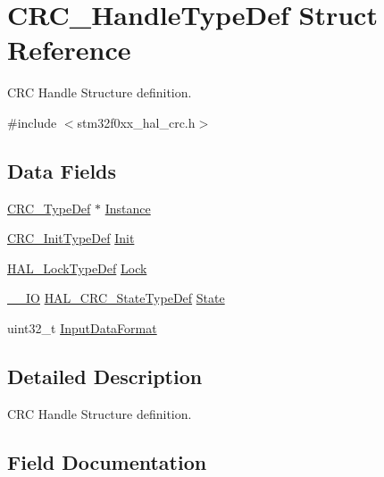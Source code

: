 \hypertarget{struct_c_r_c___handle_type_def}{}\section{C\+R\+C\+\_\+\+Handle\+Type\+Def Struct Reference}
\label{struct_c_r_c___handle_type_def}


C\+RC Handle Structure definition.  




{\ttfamily \#include $<$stm32f0xx\+\_\+hal\+\_\+crc.\+h$>$}

\subsection*{Data Fields}
\begin{DoxyCompactItemize}
\item 
\hyperlink{struct_c_r_c___type_def}{C\+R\+C\+\_\+\+Type\+Def} $\ast$ \hyperlink{struct_c_r_c___handle_type_def_ad47f94224843c74bd605a4299349798a}{Instance}
\item 
\hyperlink{struct_c_r_c___init_type_def}{C\+R\+C\+\_\+\+Init\+Type\+Def} \hyperlink{struct_c_r_c___handle_type_def_a5c36434cd514a1d1d2201f4cec5f46d1}{Init}
\item 
\hyperlink{stm32f0xx__hal__def_8h_ab367482e943333a1299294eadaad284b}{H\+A\+L\+\_\+\+Lock\+Type\+Def} \hyperlink{struct_c_r_c___handle_type_def_ad4cf225029dbefe8d3fe660c33b8bb6b}{Lock}
\item 
\hyperlink{core__sc300_8h_aec43007d9998a0a0e01faede4133d6be}{\+\_\+\+\_\+\+IO} \hyperlink{group___c_r_c___exported___types_ga1021d6f27a072d45f6f3b233eefd8bbe}{H\+A\+L\+\_\+\+C\+R\+C\+\_\+\+State\+Type\+Def} \hyperlink{struct_c_r_c___handle_type_def_a5d303997b28e27531cbcff9d51113dc6}{State}
\item 
uint32\+\_\+t \hyperlink{struct_c_r_c___handle_type_def_a4edbae35710a51deebfbbbb329186fd3}{Input\+Data\+Format}
\end{DoxyCompactItemize}


\subsection{Detailed Description}
C\+RC Handle Structure definition. 

\subsection{Field Documentation}
\mbox{\label{struct_c_r_c___handle_type_def_a5c36434cd514a1d1d2201f4cec5f46d1}} 

